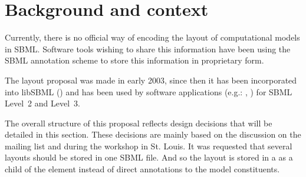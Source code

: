 \section{Background and context}
\label{background}
Currently, there is no official way of encoding the layout of 
computational models in SBML. Software tools wishing to share this 
information have been using the SBML annotation scheme to store this 
information in proprietary form. 

The layout proposal was made in early 2003, since then it has been 
incorporated into libSBML (\cite{Gauges01082006}) and has been used by 
software applications (e.g.: \cite{COPASI}, \cite{sbw}) for SBML Level~2 
and Level~3. 

The overall structure of this proposal reflects design decisions that 
will be detailed in this section. These decisions are mainly based on 
the discussion on the mailing list and during the workshop in St. Louis. 
It was requested that several layouts should be stored in one SBML file. 
And so the layout is stored in a \ListOfLayouts as a child of the 
\Model element instead of direct annotations to the model constituents. 


